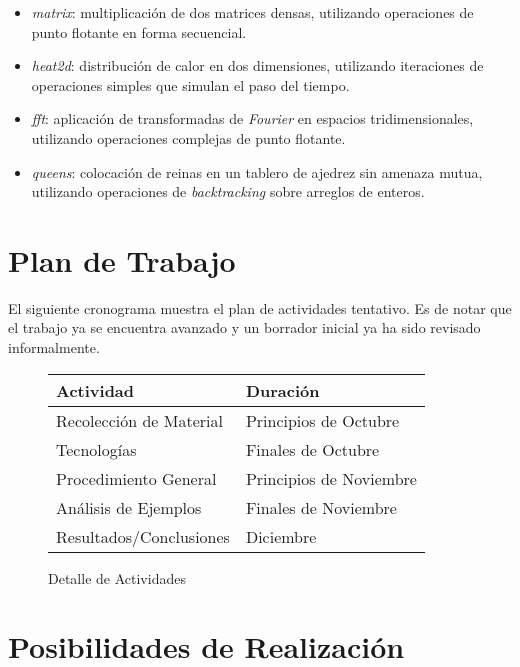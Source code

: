 \documentclass[a4paper]{article}
\begin{document}
\begin{itemize}

\item \emph{matrix}: multiplicaci\'on de dos matrices densas, utilizando
  operaciones de punto flotante en forma secuencial.

\item \emph{heat2d}: distribuci\'on de calor en dos dimensiones, utilizando
  iteraciones de operaciones simples que simulan el paso del tiempo.

\item \emph{fft}: aplicaci\'on de transformadas de {\it Fourier} en espacios
  tridimensionales, utilizando operaciones complejas de punto flotante.

\item \emph{queens}: colocaci\'on de reinas en un tablero de ajedrez sin
  amenaza mutua, utilizando operaciones de {\it backtracking} sobre arreglos
  de enteros.

\end{itemize}

\section{Plan de Trabajo}

El siguiente cronograma muestra el plan de actividades tentativo.
Es de notar que el trabajo ya se encuentra avanzado y un borrador
inicial ya ha sido revisado informalmente.

\begin{figure}[H]
  \begin{center}
    \begin{tabular}{|l|l|}\hline
      {\bf Actividad} & {\bf Duraci\'on} \\ \hline
      Recolecci\'on de Material & Principios de Octubre \\ \hline
      Tecnolog\'ias & Finales de Octubre \\ \hline
      Procedimiento General & Principios de Noviembre \\ \hline
      An\'alisis de Ejemplos & Finales de Noviembre \\ \hline
      Resultados/Conclusiones & Diciembre \\ \hline
    \end{tabular}
    \caption{Detalle de Actividades}
  \end{center}
  \label{schedule}
\end{figure}

\section{Posibilidades de Realizaci\'on}
\end{document}
